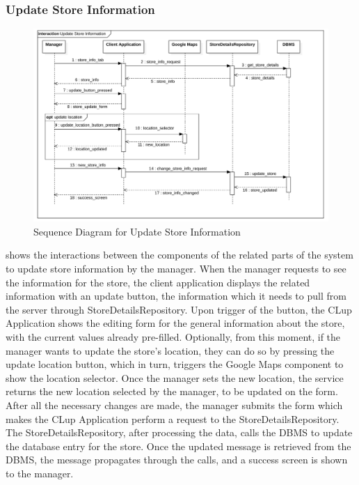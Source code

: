 \subsubsection{Update Store Information}
\begin{figure}[H]
    \centering
    \includegraphics[height=0.4\textwidth]{Images/SequenceDiagrams/UpdateStoreInformation.png}
    \caption{Sequence Diagram for Update Store Information}
    \label{fig:SDUpdateStoreInformation}
\end{figure}
 shows the interactions between the components of the related parts of the system to update store information by the manager.
When the manager requests to see the information for the store, the client application displays the related information with an update button, the information which it needs to pull from the server through StoreDetailsRepository.
Upon trigger of the button, the CLup Application shows the editing form for the general information about the store, with the current values already pre-filled.
Optionally, from this moment, if the manager wants to update the store's location, they can do so by pressing the update location button, which in turn, triggers the Google Maps component to show the location selector.
Once the manager sets the new location, the service returns the new location selected by the manager, to be updated on the form.
After all the necessary changes are made, the manager submits the form which makes the CLup Application perform a request to the StoreDetailsRepository.
The StoreDetailsRepository, after processing the data, calls the DBMS to update the database entry for the store.
Once the updated message is retrieved from the DBMS, the message propagates through the calls, and a success screen is shown to the manager.

